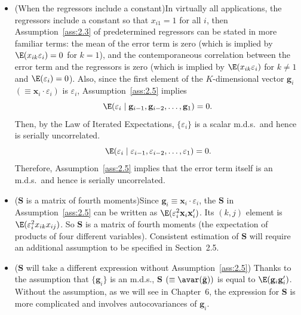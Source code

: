 \begin{itemize}
\item (When the regressors include a constant)\quad In virtually all applications,
  the regressors include a constant so that $x_{i1} = 1$ for all $i$, then
  Assumption~\ref{ass:2.3} of predetermined regressors can be stated in more familiar
  terms: the mean of the error term is zero (which is implied by
  $\E(x_{ik}\varepsilon_i) = 0$ for $k = 1$), and the contemporaneous correlation
  between the error term and the regressors is zero (which is implied by
  $\E(x_{ik}\varepsilon_i)$ for $k \neq 1$ and $\E(\varepsilon_i) = 0$).  Also,
  since the first element of the $K$-dimensional vector
  $\mathbf{g}_i$ $(\equiv \mathbf{x}_i \cdot \varepsilon_i)$ is $\varepsilon_i$,
  Assumption~\ref{ass:2.5} implies
  \[
    \E(\varepsilon_i \mid \mathbf{g}_{i-1}, \mathbf{g}_{i-2}, \ldots,
    \mathbf{g}_1) = 0.
  \]
  Then, by the Law of Iterated Expectations, $\{\varepsilon_i\}$ is a scalar m.d.s.\ and
  hence is serially uncorrelated.
  \begin{equation}
    \E(\varepsilon_i \mid \varepsilon_{i-1}, \varepsilon_{i-2}, \ldots,
    \varepsilon_1) = 0.
    \label{eq:2.3.3}
  \end{equation}
  Therefore, Assumption~\ref{ass:2.5} implies that the error term itself is an m.d.s.\
  and hence is serially uncorrelated.

\item ($\mathbf{S}$ is a matrix of fourth moments)\quad Since
  $\mathbf{g}_i \equiv \mathbf{x}_i \cdot \varepsilon_i$, the $\mathbf{S}$ in
  Assumption~\ref{ass:2.5} can be written as
  $\E(\varepsilon_i^2\mathbf{x}_i\mathbf{x}_i')$.  Its $(k,j)$ element is
  $\E(\varepsilon_i^2 x_{ik} x_{ij})$.  So $\mathbf{S}$ is a matrix of fourth moments
  (the expectation of products of four different variables).  Consistent estimation of
  $\mathbf{S}$ will require an additional assumption to be specified in Section~2.5.

\item ($\mathbf{S}$ will take a different expression without Assumption~\ref{ass:2.5})
  \quad Thanks to the assumption that $\{\mathbf{g}_i\}$ is an m.d.s.,
  $\mathbf{S}$ $(\equiv \avar(\bar{\mathbf{g}}))$ is equal to
  $\E(\mathbf{g}_i\mathbf{g}_i')$.  Without the assumption, as we will see in
  Chapter~6, the expression for $\mathbf{S}$ is more complicated and involves
  autocovariances of $\mathbf{g}_i$.
\end{itemize}

